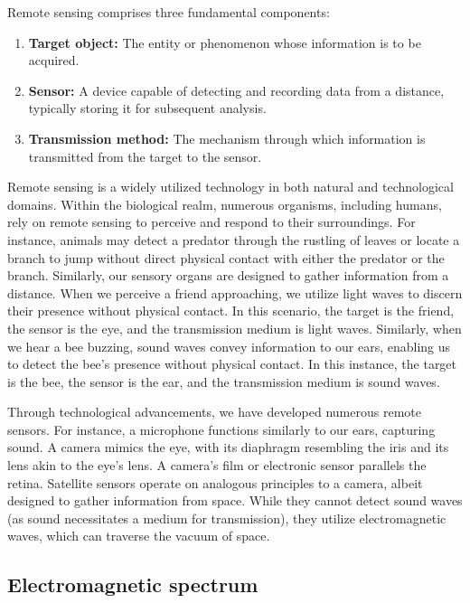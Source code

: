 \documentclass[
  12 pt,
]{Nemilov}
\providecommand{\tightlist}{%
  \setlength{\itemsep}{0pt}\setlength{\parskip}{0pt}}
\begin{document}
Remote sensing comprises three fundamental components:

\begin{enumerate}
\def\labelenumi{\arabic{enumi}.}
\tightlist
\item
  \textbf{Target object:} The entity or phenomenon whose information is to be acquired.
\item
  \textbf{Sensor:} A device capable of detecting and recording data from a distance, typically storing it for subsequent analysis.
\item
  \textbf{Transmission method:} The mechanism through which information is transmitted from the target to the sensor.
\end{enumerate}

Remote sensing is a widely utilized technology in both natural and technological domains. Within the biological realm, numerous organisms, including humans, rely on remote sensing to perceive and respond to their surroundings. For instance, animals may detect a predator through the rustling of leaves or locate a branch to jump without direct physical contact with either the predator or the branch. Similarly, our sensory organs are designed to gather information from a distance. When we perceive a friend approaching, we utilize light waves to discern their presence without physical contact. In this scenario, the target is the friend, the sensor is the eye, and the transmission medium is light waves. Similarly, when we hear a bee buzzing, sound waves convey information to our ears, enabling us to detect the bee's presence without physical contact. In this instance, the target is the bee, the sensor is the ear, and the transmission medium is sound waves.

Through technological advancements, we have developed numerous remote sensors. For instance, a microphone functions similarly to our ears, capturing sound. A camera mimics the eye, with its diaphragm resembling the iris and its lens akin to the eye's lens. A camera's film or electronic sensor parallels the retina. Satellite sensors operate on analogous principles to a camera, albeit designed to gather information from space. While they cannot detect sound waves (as sound necessitates a medium for transmission), they utilize electromagnetic waves, which can traverse the vacuum of space.

\subsection{Electromagnetic spectrum}\label{electromagnetic-spectrum}
\end{document}
